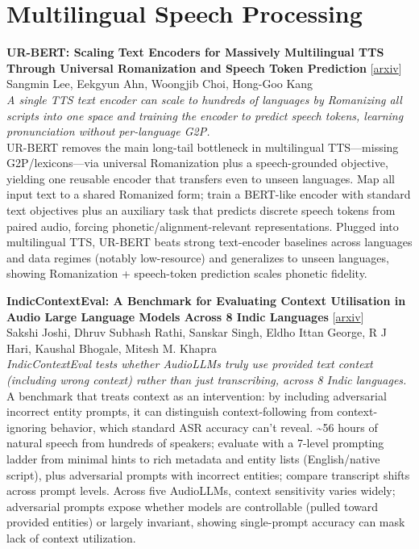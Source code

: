 \documentclass[12pt,letterpaper]{article}
\begin{document}
\medskip


\section*{Multilingual Speech Processing}

{\small\textbf{UR-BERT: Scaling Text Encoders for Massively Multilingual TTS Through Universal Romanization and Speech Token Prediction}} {\scriptsize[\href{https://arxiv.org/abs/2606.11681}{arxiv}]}\\
{\scriptsize Sangmin Lee, Eekgyun Ahn, Woongjib Choi, Hong-Goo Kang}\\

{\small\textit{A single TTS text encoder can scale to hundreds of languages by Romanizing all scripts into one space and training the encoder to predict speech tokens, learning pronunciation without per-language G2P.}}\\[1pt]
{\footnotesize UR-BERT removes the main long-tail bottleneck in multilingual TTS---missing G2P/lexicons---via universal Romanization plus a speech-grounded objective, yielding one reusable encoder that transfers even to unseen languages. Map all input text to a shared Romanized form; train a BERT-like encoder with standard text objectives plus an auxiliary task that predicts discrete speech tokens from paired audio, forcing phonetic/alignment-relevant representations. Plugged into multilingual TTS, UR-BERT beats strong text-encoder baselines across languages and data regimes (notably low-resource) and generalizes to unseen languages, showing Romanization + speech-token prediction scales phonetic fidelity.}

\medskip

{\small\textbf{IndicContextEval: A Benchmark for Evaluating Context Utilisation in Audio Large Language Models Across 8 Indic Languages}} {\scriptsize[\href{https://arxiv.org/abs/2606.19157}{arxiv}]}\\
{\scriptsize Sakshi Joshi, Dhruv Subhash Rathi, Sanskar Singh, Eldho Ittan George, R J Hari, Kaushal Bhogale, Mitesh M. Khapra}\\

{\small\textit{IndicContextEval tests whether AudioLLMs truly use provided text context (including wrong context) rather than just transcribing, across 8 Indic languages.}}\\[1pt]
{\footnotesize A benchmark that treats context as an intervention: by including adversarial incorrect entity prompts, it can distinguish context-following from context-ignoring behavior, which standard ASR accuracy can't reveal. \textasciitilde{}56 hours of natural speech from hundreds of speakers; evaluate with a 7-level prompting ladder from minimal hints to rich metadata and entity lists (English/native script), plus adversarial prompts with incorrect entities; compare transcript shifts across prompt levels. Across five AudioLLMs, context sensitivity varies widely; adversarial prompts expose whether models are controllable (pulled toward provided entities) or largely invariant, showing single-prompt accuracy can mask lack of context utilization.}
\end{document}
